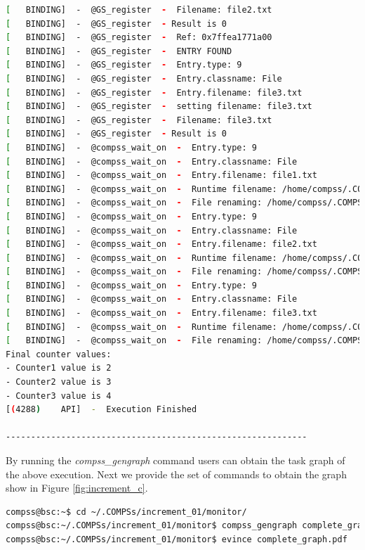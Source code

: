 \begin{lstlisting}[language=bash]
[   BINDING]  -  @GS_register  -  Filename: file2.txt
[   BINDING]  -  @GS_register  - Result is 0
[   BINDING]  -  @GS_register  -  Ref: 0x7ffea1771a00
[   BINDING]  -  @GS_register  -  ENTRY FOUND
[   BINDING]  -  @GS_register  -  Entry.type: 9
[   BINDING]  -  @GS_register  -  Entry.classname: File
[   BINDING]  -  @GS_register  -  Entry.filename: file3.txt
[   BINDING]  -  @GS_register  -  setting filename: file3.txt
[   BINDING]  -  @GS_register  -  Filename: file3.txt
[   BINDING]  -  @GS_register  - Result is 0
[   BINDING]  -  @compss_wait_on  -  Entry.type: 9
[   BINDING]  -  @compss_wait_on  -  Entry.classname: File
[   BINDING]  -  @compss_wait_on  -  Entry.filename: file1.txt
[   BINDING]  -  @compss_wait_on  -  Runtime filename: /home/compss/.COMPSs/increment_01/tmpFiles/d1v11_1479142004112.IT
[   BINDING]  -  @compss_wait_on  -  File renaming: /home/compss/.COMPSs/increment_01/tmpFiles/d1v11_1479142004112.IT to file1.txt
[   BINDING]  -  @compss_wait_on  -  Entry.type: 9
[   BINDING]  -  @compss_wait_on  -  Entry.classname: File
[   BINDING]  -  @compss_wait_on  -  Entry.filename: file2.txt
[   BINDING]  -  @compss_wait_on  -  Runtime filename: /home/compss/.COMPSs/increment_01/tmpFiles/d2v11_1479142004112.IT
[   BINDING]  -  @compss_wait_on  -  File renaming: /home/compss/.COMPSs/increment_01/tmpFiles/d2v11_1479142004112.IT to file2.txt
[   BINDING]  -  @compss_wait_on  -  Entry.type: 9
[   BINDING]  -  @compss_wait_on  -  Entry.classname: File
[   BINDING]  -  @compss_wait_on  -  Entry.filename: file3.txt
[   BINDING]  -  @compss_wait_on  -  Runtime filename: /home/compss/.COMPSs/increment_01/tmpFiles/d3v11_1479142004112.IT
[   BINDING]  -  @compss_wait_on  -  File renaming: /home/compss/.COMPSs/increment_01/tmpFiles/d3v11_1479142004112.IT to file3.txt
Final counter values: 
- Counter1 value is 2
- Counter2 value is 3
- Counter3 value is 4
[(4288)    API]  -  Execution Finished

------------------------------------------------------------
\end{lstlisting}

By running the \textit{compss\_gengraph} command users can obtain the task graph of the above execution. Next we provide the set of commands
to obtain the graph show in Figure \ref{fig:increment_c}.

\begin{lstlisting}[language=bash]
compss@bsc:~$ cd ~/.COMPSs/increment_01/monitor/
compss@bsc:~/.COMPSs/increment_01/monitor$ compss_gengraph complete_graph.dot
compss@bsc:~/.COMPSs/increment_01/monitor$ evince complete_graph.pdf
\end{lstlisting}

